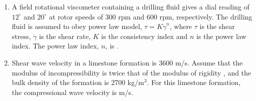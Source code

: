 \documentclass[journal,12pt,onecolumn]{IEEEtran}
\theoremstyle{remark}
\begin{document}
\begin{enumerate}
\item  A field rotational viscometer containing a drilling fluid gives a dial reading of $12^\circ$ and $20^\circ$ at rotor speeds of 300 rpm and 600 rpm, respectively. The drilling fluid is assumed to obey power law model, $\tau = K \dot{\gamma}^n$, where $\tau$ is the shear stress, $\dot{\gamma}$ is the shear rate, $K$ is the consistency index and $n$ is the power law index. The power law index, $n$, is \underline{\hspace{1cm}} .
\begin{enumerate}
\end{enumerate}
\hfill{}



\item  Shear wave velocity  in a limestone formation is 3600 m/s. Assume that the modulus of incompressibility  is twice that of the modulus of rigidity , and the bulk density  of the formation is 2700 kg/m$^3$. For this limestone formation, the compressional wave velocity  is \underline{\hspace{1cm}} m/s.
\begin{enumerate}
\end{enumerate}
\hfill{}




\end{enumerate}
\end{document}
